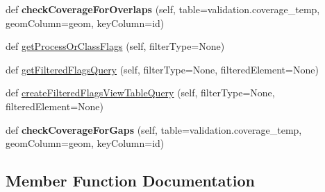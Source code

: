 \begin{DoxyCompactItemize}
def {\bfseries check\+Coverage\+For\+Overlaps} (self, table=\textquotesingle{}validation.\+coverage\+\_\+temp\textquotesingle{}, geom\+Column=\textquotesingle{}geom\textquotesingle{}, key\+Column=\textquotesingle{}id\textquotesingle{})
\item 
def \mbox{\hyperlink{class_dsg_tools_1_1_factories_1_1_sql_factory_1_1postgis_sql_generator_1_1_post_g_i_s_sql_generator_a09f19fc77a6cc3d0b8b6e1d51f50a961}{get\+Process\+Or\+Class\+Flags}} (self, filter\+Type=None)
\item 
def \mbox{\hyperlink{class_dsg_tools_1_1_factories_1_1_sql_factory_1_1postgis_sql_generator_1_1_post_g_i_s_sql_generator_aa60e66a7b85ec413c92536b65eac6718}{get\+Filtered\+Flags\+Query}} (self, filter\+Type=None, filtered\+Element=None)
\item 
def \mbox{\hyperlink{class_dsg_tools_1_1_factories_1_1_sql_factory_1_1postgis_sql_generator_1_1_post_g_i_s_sql_generator_a39a535b44add20015bec0d08f2bcf3ba}{create\+Filtered\+Flags\+View\+Table\+Query}} (self, filter\+Type=None, filtered\+Element=None)
\item 
\mbox{\label{class_dsg_tools_1_1_factories_1_1_sql_factory_1_1postgis_sql_generator_1_1_post_g_i_s_sql_generator_a33565c2332a9cf3d4a48b43a12cd255d}} 
def {\bfseries check\+Coverage\+For\+Gaps} (self, table=\textquotesingle{}validation.\+coverage\+\_\+temp\textquotesingle{}, geom\+Column=\textquotesingle{}geom\textquotesingle{}, key\+Column=\textquotesingle{}id\textquotesingle{})
\end{DoxyCompactItemize}


\subsection{Member Function Documentation}
\mbox{\label{class_dsg_tools_1_1_factories_1_1_sql_factory_1_1postgis_sql_generator_1_1_post_g_i_s_sql_generator_a39a535b44add20015bec0d08f2bcf3ba}} 
